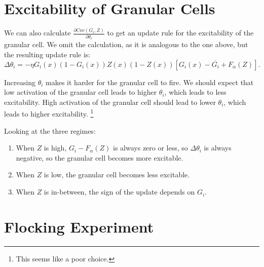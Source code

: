 \documentclass{article}
\theoremstyle{definition}
\begin{document}
\section{Excitability of Granular Cells}

We can also calculate $\frac{\partial Cov(G_i, Z)}{\partial \theta_i}$
to get an update rule for the excitability of the granular cell. We
omit the calculation, as it is analogous to the one above, but the
resulting update rule is:
$$\Delta \theta_i = -\eta G_i(x) (1 - G_i(x)) Z(x) (1 - Z(x)) \left[
  G_i(x) - \overline{G_i} + F_\alpha(Z) \right].$$


Increasing $\theta_i$ makes it harder for the granular cell to fire.
We should expect that low activation of the granular cell leads to
higher $\theta_i$, which leads to less excitability. High activation
of the granular cell should lead to lower $\theta_i$, which leads to
higher excitability. \footnote{This seems like a poor choice.}

Looking at the three regimes:
\begin{enumerate}
\item When $Z$ is high, $G_i - F_\alpha(Z)$ is always zero or less, so
  $\Delta \theta_i$ is always negative, so the granular cell becomes
  more excitable.
\item When $Z$ is low, the granular cell becomes less excitable.
\item When $Z$ is in-between, the sign of the update depends on $G_i$.
\end{enumerate}

\section{Flocking Experiment}
\end{document}
